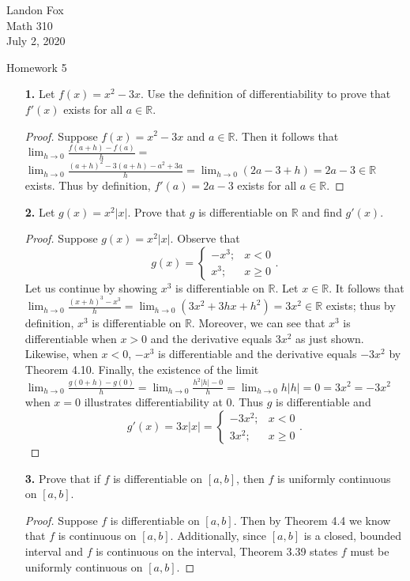 \documentclass[ 12pt ]{article}
\begin{document}
\noindent Landon Fox \\
\noindent Math 310 \\
\noindent July 2, 2020

\begin{center}
\Large Homework 5
\end{center}

\begin{enumerate}
	\item[\textbf{1.}] Let $f(x) = x^2 - 3x$. Use the definition of differentiability to prove that $f'(x)$ exists for all $a \in \mathbb{R}$.

	\begin{proof}
		Suppose $f(x) = x^2 - 3x$ and $a \in \mathbb{R}$. Then it follows that $\lim_{h \rightarrow 0} \frac{f(a+h) - f(a)}{h} =$ \\
		$\lim_{h \rightarrow 0} \frac{(a+h)^2 - 3(a+h) - a^2 + 3a}{h} = \lim_{h \rightarrow 0} (2a - 3 + h) = 2a - 3 \in \mathbb{R}$ exists. Thus by definition,
		$f'(a) = 2a - 3$ exists for all $a \in \mathbb{R}$.
	\end{proof}


	\item[\textbf{2.}] Let $g(x) = x^2|x|$. Prove that $g$ is differentiable on $\mathbb{R}$ and find $g'(x)$.

	\begin{proof}
		Suppose $g(x) = x^2|x|$. Observe that \[ g(x) = \begin{cases} -x^3; & x < 0 \\ x^3; & x \geq 0 \end{cases}. \] Let us continue by showing $x^3$ is differentiable on
		$\mathbb{R}$. Let $x \in \mathbb{R}$. It follows that $\lim_{h \rightarrow 0} \frac{(x+h)^3 - x^3}{h} = \lim_{h \rightarrow 0} (3x^2 + 3hx + h^2) =
		3x^2 \in \mathbb{R}$ exists; thus by definition, $x^3$ is differentiable on $\mathbb{R}$. Moreover, we can see that $x^3$ is differentiable when $x > 0$
		and the derivative equals $3x^2$ as just shown. Likewise, when $x < 0$, $-x^3$ is differentiable and the derivative equals $-3x^2$ by Theorem 4.10. Finally, the existence of the limit
		$\lim_{h \rightarrow 0} \frac{g(0+h) - g(0)}{h} = \lim_{h \rightarrow 0} \frac{h^2|h| - 0}{h} = \lim_{h \rightarrow 0} h|h| = 0 = 3x^2 = -3x^2$ when $x = 0$
		illustrates differentiability at $0$. Thus $g$ is differentiable and \[ g'(x) = 3x|x| = \begin{cases} -3x^2; & x < 0 \\ 3x^2; & x \geq 0 \end{cases}. \]
	\end{proof}


	\item[\textbf{3.}] Prove that if $f$ is differentiable on $[a, b]$, then $f$ is uniformly continuous on $[a, b]$.

	\begin{proof}
		Suppose $f$ is differentiable on $[a, b]$. Then by Theorem 4.4 we know that $f$ is continuous on $[a, b]$. Additionally, since $[a, b]$ is a closed, bounded interval
		and $f$ is continuous on the interval, Theorem 3.39 states $f$ must be uniformly continuous on $[a, b]$.
	\end{proof}

\end{enumerate}
\end{document}
